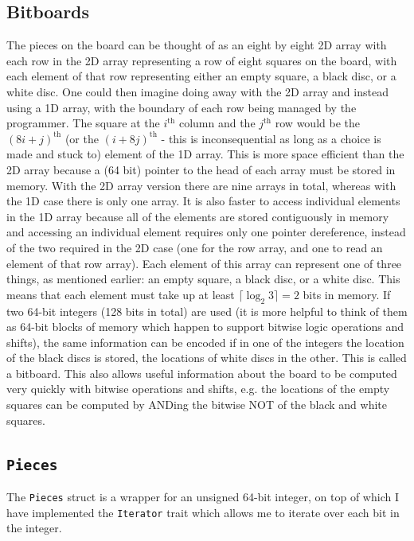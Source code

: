 \documentclass[12pt, a4paper]{report}
\begin{document}
\subsection{Bitboards}
The pieces on the board can be thought of as an eight by eight 2D array with each row in the 2D array representing a row of eight squares on the board, with each element of that row representing either an empty square, a black disc, or a white disc.
One could then imagine doing away with the 2D array and instead using a 1D array, with the boundary of each row being managed by the programmer. The square at the \(i^{\textrm{th}}\) column and the \(j^{\textrm{th}}\) row
would be the \((8i + j)^{\textrm{th}}\) (or the \((i + 8j)^{\textrm{th}}\) - this is inconsequential as long as a choice is made and stuck to) element of the 1D array. This is more space efficient than the 2D array because a (64 bit) pointer
to the head of each array must be stored in memory. With the 2D array version there are nine arrays in total, whereas with the 1D case there is only one array. It is also faster to access individual elements in the 1D array because
all of the elements are stored contiguously in memory and accessing an individual element requires only one pointer dereference, instead of the two required in the 2D case (one for the row array, and one to read an element of that row array).
Each element of this array can represent one of three things, as mentioned earlier: an empty square, a black disc, or a white disc. This means that each element must take up at least \(\lceil\log_{2}3\rceil = 2\) bits in memory.
If two 64-bit integers (128 bits in total) are used (it is more helpful to think of them as 64-bit blocks of memory which happen to support bitwise logic operations and shifts), the same information can be encoded if in one of the
integers the location of the black discs is stored, the locations of white discs in the other. This is called a bitboard. This also allows useful information about the board to be computed very quickly with bitwise operations and shifts, 
e.g. the locations of the empty squares can be computed by ANDing the bitwise NOT of the black and white squares.

\subsection{\texttt{Pieces}}
\label{pieces}
The \texttt{Pieces} struct is a wrapper for an unsigned 64-bit integer, on top of which I have implemented the \texttt{Iterator} trait which allows me to iterate over each bit in the integer.
\end{document}
